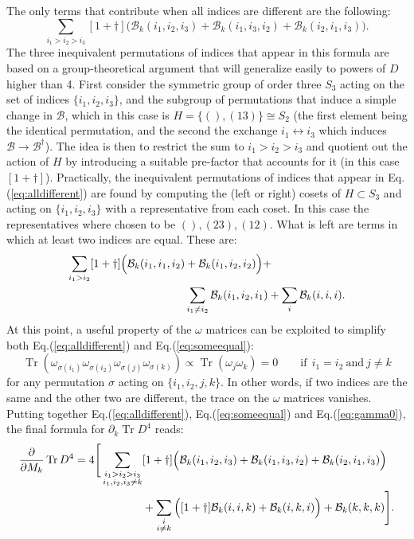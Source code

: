 \documentclass[12pt,a4paper]{article}
\DeclareMathOperator{\Tr}{Tr}
\begin{document}
The only terms that contribute when all indices are different are the following:
\begin{equation} \label{eq:alldifferent}
\sum_{i_1 > i_2 > i_3} [1+\dagger] \Big( \mathcal{B}_k(i_1, i_2, i_3) + \mathcal{B}_k(i_1, i_3, i_2) + \mathcal{B}_k(i_2, i_1, i_3) \Big).
\end{equation}
The three inequivalent permutations of indices that appear in this formula are based on a group-theoretical argument that will generalize easily to powers of $D$ higher than 4. First consider the symmetric group of order three $S_3$ acting on the set of indices $\{i_1, i_2, i_3\}$, and the subgroup of permutations that induce a simple change in $\mathcal{B}$, which in this case is $H = \{(), (13)\} \cong S_2$ (the first element being the identical permutation, and the second the exchange $i_1 \leftrightarrow i_3$ which induces $\mathcal{B} \rightarrow \mathcal{B}^\dagger$). The idea is then to restrict the sum to $i_1 > i_2 > i_3$ and quotient out the action of $H$ by introducing a suitable pre-factor that accounts for it (in this case $[1+\dagger]$). Practically, the inequivalent permutations of indices that appear in Eq.(\ref{eq:alldifferent}) are found by computing the (left or right) cosets of $H \subset S_3$ and acting on $\{i_1, i_2, i_3\}$ with a representative from each coset. In this case the representatives where chosen to be $(), (23), (12)$.\newline
What is left are terms in which at least two indices are equal. These are:
\begin{align} \label{eq:someequal}
\sum_{i_1 > i_2} [1+\dagger] \Big( \mathcal{B}_k(i_1, i_1, i_2) &+ \mathcal{B}_k(i_1, i_2, i_2) \Big) + \notag \\
&\sum_{i_1 \neq i_2} \mathcal{B}_k(i_1, i_2, i_1) + \sum_{i} \mathcal{B}_k(i,i,i).
\end{align}
At this point, a useful property of the $\omega$ matrices can be exploited to simplify both Eq.(\ref{eq:alldifferent}) and Eq.(\ref{eq:someequal}):
\begin{equation}\label{eq:gamma0}
\Tr(\omega_{\sigma(i_1)} \omega_{\sigma(i_2)} \omega_{\sigma(j)} \omega_{\sigma(k)}) \propto \Tr(\omega_j \omega_k) = 0 \qquad \text{if} \ \ i_1 = i_2 \ \text{and} \ j \neq k
\end{equation}
for any permutation $\sigma$ acting on $\{i_1, i_2, j, k\}$. In other words, if two indices are the same and the other two are different, the trace on the $\omega$ matrices vanishes.\newline
Putting together Eq.(\ref{eq:alldifferent}), Eq.(\ref{eq:someequal}) and Eq.(\ref{eq:gamma0}), the final formula for $\partial_k \Tr D^4$ reads:
\begin{align} 
\frac{\partial}{\partial M_k} \Tr D^4 = 4 \Bigg[ \sum_{\substack{i_1 > i_2 > i_3 \\ i_1,i_2,i_3 \neq k}} &[1+\dagger] \Big( \mathcal{B}_k(i_1, i_2, i_3) + \mathcal{B}_k(i_1, i_3, i_2) + \mathcal{B}_k(i_2, i_1, i_3) \Big) \notag \\
&+ \sum_{\substack{i \\ i \neq k}} \Big( [1+\dagger] \mathcal{B}_k(i, i, k) + \mathcal{B}_k(i, k, i) \Big) + \mathcal{B}_k(k,k,k) \Bigg].
\end{align}
\end{document}

